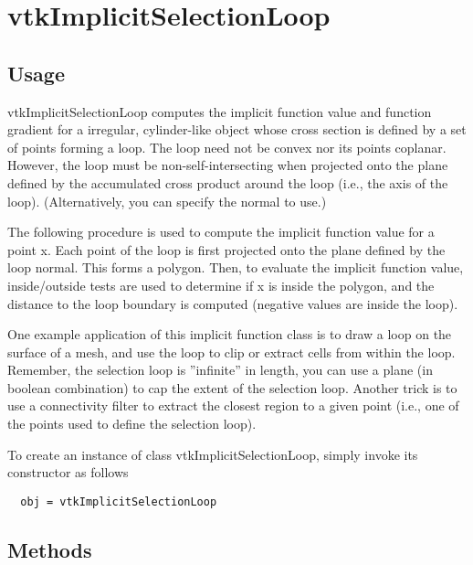 \section{vtkImplicitSelectionLoop}

\subsection{Usage}

 vtkImplicitSelectionLoop computes the implicit function value and
 function gradient for a irregular, cylinder-like object whose cross
 section is defined by a set of points forming a loop. The loop need
 not be convex nor its points coplanar. However, the loop must be
 non-self-intersecting when projected onto the plane defined by the
 accumulated cross product around the loop (i.e., the axis of the
 loop). (Alternatively, you can specify the normal to use.)

 The following procedure is used to compute the implicit function
 value for a point x. Each point of the loop is first projected onto
 the plane defined by the loop normal. This forms a polygon. Then,
 to evaluate the implicit function value, inside/outside tests are
 used to determine if x is inside the polygon, and the distance to
 the loop boundary is computed (negative values are inside the
 loop).

 One example application of this implicit function class is to draw a 
 loop on the surface of a mesh, and use the loop to clip or extract 
 cells from within the loop. Remember, the selection loop is ''infinite'' 
 in length, you can use a plane (in boolean combination) to cap the extent
 of the selection loop. Another trick is to use a connectivity filter to
 extract the closest region to a given point (i.e., one of the points used
 to define the selection loop).

To create an instance of class vtkImplicitSelectionLoop, simply
invoke its constructor as follows
\begin{verbatim}
  obj = vtkImplicitSelectionLoop
\end{verbatim}
\subsection{Methods}

